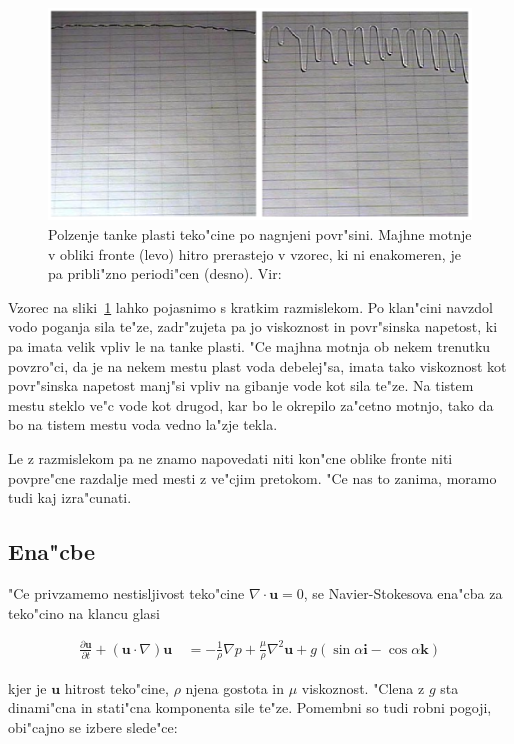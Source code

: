 \documentclass[a4paper,12pt]{article}
\renewcommand{\vec}{\mathbf}
\begin{document}
\begin{figure}[h]
\centering
 \includegraphics[width=.9\textwidth]{./Slike/film-slika}
\caption{Polzenje tanke plasti teko"cine po nagnjeni povr"sini. Majhne motnje v obliki fronte (levo) hitro prerastejo v vzorec, ki ni enakomeren, je pa pribli"zno periodi"cen (desno). Vir: \cite{kondic}}
\label{fig:film-neenakomernost}
\end{figure}

Vzorec na sliki~\ref{fig:film-neenakomernost} lahko pojasnimo s kratkim razmislekom. Po klan"cini navzdol vodo poganja sila te"ze, zadr"zujeta pa jo viskoznost in povr"sinska napetost, ki pa imata velik vpliv le na tanke plasti. "Ce majhna motnja ob nekem trenutku povzro"ci, da je na nekem mestu plast voda debelej"sa, imata tako viskoznost kot povr"sinska napetost manj"si vpliv na gibanje vode kot sila te"ze. Na tistem mestu steklo ve"c vode kot drugod, kar bo le okrepilo za"cetno motnjo, tako da bo na tistem mestu voda vedno la"zje tekla. 

Le z razmislekom pa ne znamo napovedati niti kon"cne oblike fronte niti povpre"cne razdalje med mesti z ve"cjim pretokom. "Ce nas to zanima, moramo tudi kaj izra"cunati. 

\subsection{Ena"cbe}

"Ce privzamemo nestisljivost teko"cine $\nabla \cdot \vec u = 0$, se Navier-Stokesova ena"cba za teko"cino na klancu glasi 

\begin{align}
 \label{eq:ns-film}
 \frac{\partial \vec u}{\partial t} + (\vec u \cdot \nabla) \vec u\ &= -\frac{1}{\rho}\nabla p + \frac{\mu}{\rho}\nabla^2 \vec u + g (\sin \alpha \vec i - \cos \alpha \vec k)
\end{align}

kjer je $\vec u$ hitrost teko"cine, $\rho$ njena gostota in $\mu$ viskoznost. "Clena z $g$ sta dinami"cna in stati"cna komponenta sile te"ze. Pomembni so tudi robni pogoji, obi"cajno se izbere slede"ce:
\end{document}
